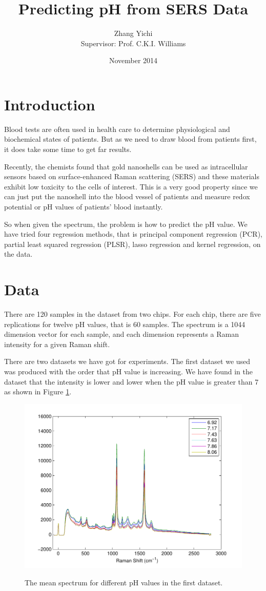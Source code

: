 \documentclass[a4paper]{article}
\begin{document}
\title{\textbf{Predicting pH from SERS Data}}
\author{Zhang Yichi\\ Supervisor: Prof. C.K.I. Williams}
\date{November 2014}
\maketitle

\section{Introduction}
Blood tests are often used in health care to determine physiological and biochemical states of patients. But as we need to draw blood from patients first, it does take some time to get far results. 

Recently, the chemists found that gold nanoshells can be used as intracellular sensors based on surface-enhanced Raman scattering (SERS) and these materials exhibit low toxicity to the cells of interest. This is a very good property since we can just put the nanoshell into the blood vessel of patients and measure redox potential or pH values of patients' blood instantly.

So when given the spectrum, the problem is how to predict the pH value. We have tried four regression methods, that is principal component regression (PCR), partial least squared regression (PLSR), lasso regression and kernel regression, on the data.

\section{Data}
There are 120 samples in the dataset from two chips. For each chip, there are five replications for twelve pH values, that is 60 samples. The spectrum is a 1044 dimension vector for each sample, and each dimension represents a Raman intensity for a given Raman shift.

There are two datasets we have got for experiments. The first dataset we used was produced with the order that pH value is increasing. We have found in the dataset that the intensity is lower and lower when the pH value is greater than 7 as shown in Figure \ref{pic1}.

\begin{figure}[h]
  \centering
  \includegraphics[width=.6\textwidth]{images/compare.pdf}\\
  \caption{The mean spectrum for different pH values in the first dataset.}\label{pic1}
\end{figure}
\end{document}
